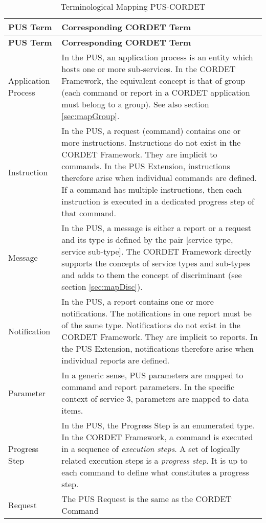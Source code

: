 \documentclass{pnp_article}
\begin{document}
\newpage
\begin{longtable}{|l|>{\raggedright\arraybackslash}p{10cm}|}
\caption{Terminological Mapping PUS-CORDET}\label{tab:termPusCr} \\
\hline
\rowcolor{light-gray}
\textbf{PUS Term} & \textbf{Corresponding CORDET Term} \\
\hline\hline
\endfirsthead
\rowcolor{light-gray}
\textbf{PUS Term} & \textbf{Corresponding CORDET Term} \\
\hline\hline
\endhead
Application Process & In the PUS, an application process is an entity which hosts one or more sub-services. In the CORDET Framework, the equivalent concept is that of group (each command or report in a CORDET application must belong to a group). See also section \ref{sec:mapGroup}. \\  
\hline
Instruction & In the PUS, a request (command) contains one or more instructions. Instructions do not exist in the CORDET Framework. They are implicit to commands. In the PUS Extension, instructions therefore arise when individual commands are defined. If a command has multiple instructions, then each instruction is executed in a dedicated progress step of that command. \\
\hline
Message & In the PUS, a message is either a report or a request and its type is defined by the pair [service type, service sub-type]. The CORDET Framework directly supports the concepts of service types and sub-types and adds to them the concept of discriminant (see section \ref{sec:mapDisc}). \\
\hline
Notification & In the PUS, a report contains one or more notifications. The notifications in one report must be of the same type. Notifications do not exist in the CORDET Framework. They are implicit to reports. In the PUS Extension, notifications therefore arise when individual reports are defined. \\
\hline
Parameter & In a generic sense, PUS parameters are mapped to command and report parameters. In the specific context of service 3, parameters are mapped to data items. \\
\hline
Progress Step & In the PUS, the Progress Step is an enumerated type. In the CORDET Framework, a command is executed in a sequence of \textit{execution steps}. A set of logically related execution steps is a \textit{progress step}. It is up to each command to define what constitutes a progress step. \\
\hline
Request & The PUS Request is the same as the CORDET Command \\

\end{longtable}
\end{document}
